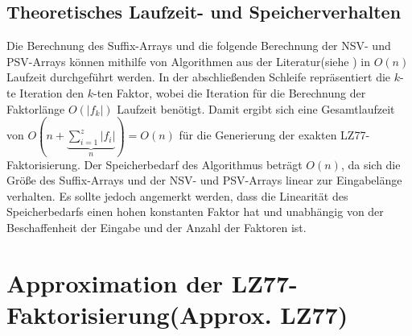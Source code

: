 \subsection{Theoretisches Laufzeit- und Speicherverhalten}
Die Berechnung des Suffix-Arrays und die folgende Berechnung der NSV- und PSV-Arrays können mithilfe von Algorithmen aus der Literatur(siehe \cite{exactLemZiv}) 
in $O(n)$ Laufzeit durchgeführt werden. In der abschließenden Schleife repräsentiert die $k$-te Iteration den $k$-ten Faktor, wobei die Iteration für die Berechnung 
der Faktorlänge $O(|f_k|)$ Laufzeit benötigt. Damit ergibt sich eine Gesamtlaufzeit von $O(n +\underbrace{\sum_{i=1}^{z} |f_i|}_{n}) = O(n)$ für die Generierung der 
exakten LZ77-Faktorisierung.
Der Speicherbedarf des Algorithmus beträgt $O(n)$, da sich die Größe des Suffix-Arrays und der NSV- und PSV-Arrays linear zur Eingabelänge verhalten. Es sollte jedoch
angemerkt werden, dass die Linearität des Speicherbedarfs einen hohen konstanten Faktor hat und unabhängig von der Beschaffenheit der Eingabe und der Anzahl der Faktoren ist.

\section{Approximation der LZ77-Faktorisierung(Approx. LZ77)}

